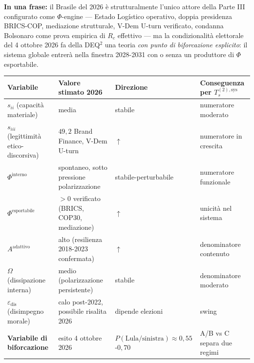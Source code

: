 \Proved{} \textbf{In una frase:} il Brasile del 2026 è strutturalmente
l'unico attore della Parte III configurato come \(\Phi\)-engine ---
Estado Logístico operativo, doppia presidenza BRICS-COP, mediazione
strutturale, V-Dem U-turn verificato, condanna Bolsonaro come prova
empirica di \(R_c\) effettivo --- ma la condizionalità elettorale del 4
ottobre 2026 fa della DEQ$^2$ una teoria \emph{con punto di biforcazione
esplicito}: il sistema globale entrerà nella finestra 2028-2031 con o
senza un produttore di \(\Phi\) esportabile.

{\def\LTcaptype{none} %
{\small\begin{longtable}[]{@{}
  >{\raggedright\arraybackslash}p{}
  >{\raggedright\arraybackslash}p{}
  >{\raggedright\arraybackslash}p{}
  >{\raggedright\arraybackslash}p{}@{}}
\toprule\noalign{}
\begin{minipage}[b]{\linewidth}\raggedright
Variabile
\end{minipage} & \begin{minipage}[b]{\linewidth}\raggedright
Valore stimato 2026
\end{minipage} & \begin{minipage}[b]{\linewidth}\raggedright
Direzione
\end{minipage} & \begin{minipage}[b]{\linewidth}\raggedright
Conseguenza per \(T_s^{(2),\text{sys}}\)
\end{minipage} \\
\midrule\noalign{}
\endhead
\bottomrule\noalign{}
\endlastfoot
\(s_{ii}\) (capacità materiale) & media & stabile & numeratore
moderato \\
\(s_{iii}\) (legittimità etico-discorsiva) & \(49{,}2\) Brand Finance,
V-Dem U-turn & \(\uparrow\) & numeratore in crescita \\
\(\Phi^{\text{interno}}\) & spontaneo, sotto pressione polarizzazione &
stabile-perturbabile & numeratore funzionale \\
\(\Phi^{\text{esportabile}}\) & \(> 0\) verificato (BRICS, COP30,
mediazione) & \(\uparrow\) & unicità nel sistema \\
\(A^{\text{adattivo}}\) & alto (resilienza 2018-2023 confermata) &
\(\uparrow\) & denominatore contenuto \\
\(\Omega\) (dissipazione interna) & medio (polarizzazione persistente) &
stabile & denominatore moderato \\
\(\varepsilon_{\text{dis}}\) (disimpegno morale) & calo post-2022,
possibile risalita 2026 & dipende elezioni & swing \\
\textbf{Variabile di biforcazione} & esito 4 ottobre 2026 &
\(P(\text{Lula/sinistra}) \approx 0{,}55\)-\(0{,}70\) & A/B vs C separa
due regimi \\
\end{longtable}}
}

